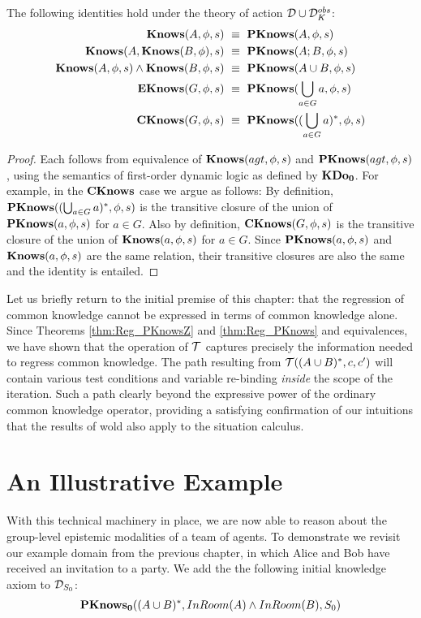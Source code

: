 \begin{thm}
The following identities hold under the theory of action $\mathcal{D}\cup\mathcal{D}_{K}^{obs}$:\begin{align*}
\mathbf{Knows}(A,\phi,s) & \,\,\equiv\,\,\mathbf{PKnows}(A,\phi,s)\\
\mathbf{Knows}(A,\mathbf{Knows}(B,\phi),s) & \,\,\equiv\,\,\mathbf{PKnows}(A;B,\phi,s)\\
\mathbf{Knows}(A,\phi,s)\wedge\mathbf{Knows}(B,\phi,s) & \,\,\equiv\,\,\mathbf{PKnows}(A\cup B,\phi,s)\\
\mathbf{EKnows}(G,\phi,s) & \,\,\equiv\,\,\mathbf{PKnows}(\bigcup_{a\in G}a,\phi,s)\\
\mathbf{CKnows}(G,\phi,s) & \,\,\equiv\,\,\mathbf{PKnows}((\bigcup_{a\in G}a)^{*},\phi,s)\end{align*}

\end{thm}
\begin{proof}
Each follows from equivalence of $\mathbf{Knows}(agt,\phi,s)$ and $\mathbf{PKnows}(agt,\phi,s)$,
using the semantics of first-order dynamic logic as defined by $\mathbf{KDo_{0}}$.
For example, in the $\mathbf{CKnows}$ case we argue as follows: By definition,
$\mathbf{PKnows}((\bigcup_{a\in G}a)^{*},\phi,s)$ is the transitive closure
of the union of $\mathbf{PKnows}(a,\phi,s)$ for $a\in G$. Also by definition,
$\mathbf{CKnows}(G,\phi,s)$ is the transitive closure of the union of $\mathbf{Knows}(a,\phi,s)$
for $a\in G$. Since $\mathbf{PKnows}(a,\phi,s)$ and $\mathbf{Knows}(a,\phi,s)$
are the same relation, their transitive closures are also the same
and the identity is entailed. 
\end{proof}
Let us briefly return to the initial premise of this chapter: that
the regression of common knowledge cannot be expressed in terms of
common knowledge alone. Since Theorems \ref{thm:Reg_PKnowsZ} and
\ref{thm:Reg_PKnows} and equivalences, we have shown that the operation
of $\mathcal{T}$ captures precisely the information needed to regress common
knowledge. The path resulting from $\mathcal{T}((A\cup B)^{*},c,c')$ will
contain various test conditions and variable re-binding \emph{inside}
the scope of the iteration. Such a path clearly beyond the expressive
power of the ordinary common knowledge operator, providing a satisfying
confirmation of our intuitions that the results of \citet{baltag98pa_ck}
wold also apply to the situation calculus.


\section{An Illustrative Example\label{sec:CKnowledge:Example}}

With this technical machinery in place, we are now able to reason
about the group-level epistemic modalities of a team of agents. To
demonstrate we revisit our example domain from the previous chapter,
in which Alice and Bob have received an invitation to a party. We
add the the following initial knowledge axiom to $\mathcal{D}_{S_{0}}$:\begin{gather*}
\mathbf{PKnows_{0}}((A\cup B)^{*},InRoom(A)\wedge InRoom(B),S_{0})\end{gather*}


